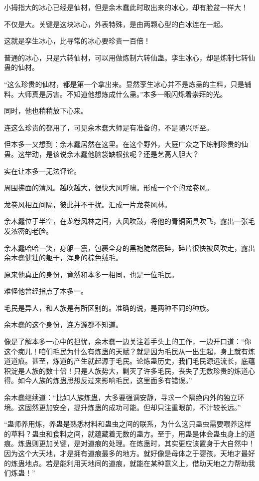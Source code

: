 \begin{this_body}
小拇指大的冰心已经是仙材，但是余木蠢此时取出来的冰心，却有脸盆一样大！

不仅是大。关键是这块冰心，外表特殊，是由两颗心型的白冰连在一起。

这就是孪生冰心，比寻常的冰心要珍贵一百倍！

普通的冰心，只是六转仙材，可以用做炼制六转仙蛊。孪生冰心，却是炼制七转仙蛊的仙材。

“这么珍贵的仙材，都是第一个拿出来。显然孪生冰心并不是炼蛊的主料，只是辅料。大师真是厉害。不知道他想炼成什么蛊。”本多一眼闪烁着崇拜的光。

同时，他也稍稍放下心来。

连这么珍贵的都用了，可见余木蠢大师是有准备的，不是随兴所至。

但本多一又想到：余木蠢居然在这里。在这个野外，大庭广众之下炼制珍贵的仙蛊。这举动，是该说余木蠢他脑袋缺根弦呢？还是艺高人胆大？

实在让本多一无法评论。

周围拂面的清风。越吹越大，很快大风呼啸。形成一个个的龙卷风。

龙卷风相互间隔，彼此并不干扰。汇成一片龙卷风林。

余木蠢位于半空，在龙卷风林之间，大风吹鼓，将他的青铜面具吹飞，露出一张毛发浓密的老脸。

余木蠢哈哈一笑，身躯一震，包裹全身的黑袍陡然震碎，碎片很快被风吹走，露出余木蠢健壮的躯干，浑身的棕色绒毛。

原来他真正的身份，竟然和本多一相同，也是一位毛民。

难怪他曾经指点了本多一。

毛民是异人，和人族是有所区别的。准确的说，是两种不同的种族。

余木蠢的这个身份，连方源都不知道。

像是了解本多一心中的担忧，余木蠢一边关注着手头上的工作，一边开口道：“你这个痴儿！咱们毛民为什么有炼蛊的天赋？就是因为毛民从一出生起，身上就有炼道道痕。甚至，炼道的产生就起源于毛民。论炼蛊历史，我们毛民源远流长，底蕴积淀是人族的数十倍！只是人族势大，剿灭了许多毛民，丧失了无数珍贵的炼道心得。如今人族的炼蛊思想反过来影响毛民，这里面多有错误。”

余木蠢继续道：“比如人族炼蛊，大多要强调安静，寻求一个隔绝内外的独立环境。这固然更加安全，提升炼蛊的成功可能。但却只注重眼前，不计较长远。”

“蛊师养用炼，养蛊是熟悉材料和蛊虫之间的联系，为什么这只蛊虫需要喂养这样的草料？蛊虫和食料之间，就蕴藏着无数的蛊方。至于，用蛊是体会蛊虫身上的道痕。炼蛊则更加关键，是对道痕的处理。在炼蛊时，其实更应该置身于大自然中！因为这个大天地，才是拥有道痕最多的地方。就好像是母体之于婴孩，天地才最好的炼蛊地点。若是能利用天地间的道痕，就能在某种意义上，借助天地之力帮助我们炼蛊！”


\end{this_body}
